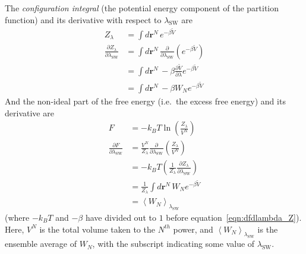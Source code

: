 \documentclass[letterpaper,twocolumn,amsmath,amssymb,prb]{revtex4-1}
\newcommand{\kT}{\ensuremath{k_BT}}
\newcommand{\rr}{\ensuremath{\mathbf{r}}}
\newcommand{\lambdaSW}{\ensuremath{\lambda_\text{SW}}}
\newcommand{\1}{\ensuremath{\textbf{r}_1}}
\newcommand{\2}{\ensuremath{\textbf{r}_2}}
\newcommand{\3}{\ensuremath{\textbf{r}_3}}
\newcommand{\4}{\ensuremath{\textbf{r}_4}}
\newcommand{\fixme}[1]{\textcolor{red}{\textbf{[#1]}}}
\begin{document}
The \emph{configuration integral} (the potential energy component of
the partition function) and its derivative with respect to $\lambdaSW$
are
\begin{align}
  Z_\lambda &= \int d\rr^N\, e^{-\beta \widetilde{V}} \\
  \frac{\partial Z_\lambda}{\partial\lambdaSW} &=  \int d\rr^N\, \frac{\partial}{\partial\lambdaSW}\left( e^{-\beta \widetilde{V}} \right) \nonumber \\
  &= \int d\rr^N\, -\beta\frac{\partial \widetilde{V}}{\partial\lambda}e^{-\beta \widetilde{V}} \nonumber \\
  &= \int d\rr^N\, -\beta W_N e^{-\beta \widetilde{V}}
\end{align}
And the non-ideal part of the free energy (i.e.~the excess free
energy) and its derivative are
\begin{align}
  F &= -\kT\ln\left( \frac{Z_\lambda}{V^N} \right) \\
  \frac{\partial F}{\partial\lambdaSW} &= \frac{V^N}{Z_\lambda}\frac{\partial}{\partial\lambdaSW}\left( \frac{Z_\lambda}{V^N} \right) \nonumber \\
  &= -\kT\left( \frac{1}{Z_\lambda}\frac{\partial Z_\lambda}{\partial\lambdaSW} \right) \nonumber \\
  &= \frac{1}{Z_\lambda} \int d\rr^N\, W_N e^{-\beta \widetilde{V}} \label{eqn:dfdlambda_Z}\\
  &= \left\langle W_N \right\rangle_{\lambdaSW} \label{eqn:dfdlambda}
\end{align}
(where $-\kT$ and $-\beta$ have divided out to $1$ before equation~\ref{eqn:dfdlambda_Z}). Here, $V^N$ is
the total volume taken to the $N^{th}$ power, and $\left\langle W_N
\right\rangle_{\lambdaSW}$ is the ensemble average of $W_N$, with the
subscript indicating some value of $\lambdaSW$.

\end{document}
